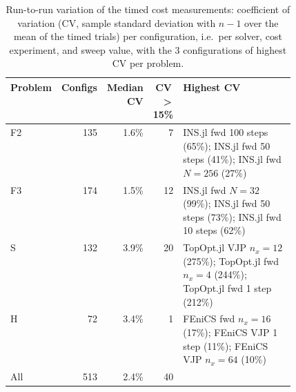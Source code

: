 \begin{table}[t]
  \centering\footnotesize
  \caption{Run-to-run variation of the timed cost measurements: coefficient of variation (CV,
    sample standard deviation with $n-1$ over the mean of the timed trials) per configuration,
    i.e.\ per solver, cost experiment, and sweep value, with the 3 configurations of
    highest CV per problem.}
  \label{tab:app:variance}
  \begin{tabular}{@{}l r r r >{\raggedright\arraybackslash}p{0.48\linewidth}@{}}
    \toprule
    \textbf{Problem} & \textbf{Configs} & \textbf{Median CV} & \textbf{CV\,>\,15\%} & \textbf{Highest CV} \\
    \midrule
      F2 & 135 & 1.6\% & 7 & INS.jl fwd 100 steps (65\%); INS.jl fwd 50 steps (41\%); INS.jl fwd $N=256$ (27\%) \\
      F3 & 174 & 1.5\% & 12 & INS.jl fwd $N=32$ (99\%); INS.jl fwd 50 steps (73\%); INS.jl fwd 10 steps (62\%) \\
      S & 132 & 3.9\% & 20 & TopOpt.jl VJP $n_x=12$ (275\%); TopOpt.jl fwd $n_x=4$ (244\%); TopOpt.jl fwd 1 step (212\%) \\
      H & 72 & 3.4\% & 1 & FEniCS fwd $n_x=16$ (17\%); FEniCS VJP 1 step (11\%); FEniCS VJP $n_x=64$ (10\%) \\
    \midrule
      All & 513 & 2.4\% & 40 & \\
    \bottomrule
  \end{tabular}
\end{table}
